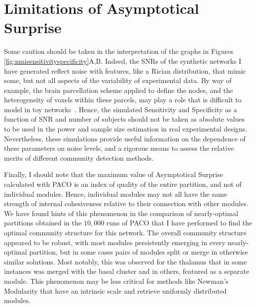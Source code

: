 \section{Limitations of Asymptotical Surprise}
Some caution should be taken in the interpretation of the graphs in Figures \ref{fig:nmisensitivityspecificity}A,B.
Indeed, the SNRs of the synthetic networks I have generated reflect noise with features, like a Rician distribution, that mimic some, but not all aspects of the variability of experimental data.
By way of example, the brain parcellation scheme applied to define the nodes, and the heterogeneity of voxels within these parcels, may play a role that is difficult to model in toy networks~\cite{fornito2010}.
Hence, the simulated Sensitivity and Specificity as a function of SNR and number of subjects should not be taken as absolute values to be used in the power and sample size estimation in real experimental designs.
Nevertheless, these simulations provide useful information on the dependence of these parameters on noise levels, and a rigorous means to assess the relative merits of different community detection methods.

Finally, I should note that the maximum value of Asymptotical Surprise calculated with PACO is an index of quality of the entire partition, and not of individual modules.
Hence, individual modules may not all have the same strength of internal cohesiveness relative to their connection with other modules.
We have found hints of this phenomenon in the comparison of nearly-optimal partitions obtained in the $10,000$ runs of PACO that I have performed to find the optimal community structure for this network.
The overall community structure appeared to be robust, with most modules persistently emerging in every nearly-optimal partition, but in some cases pairs of modules split or merge in otherwise similar solutions.
Most notably, this was observed for the thalamus that in some instances was merged with the basal cluster and in others, featured as a separate module.
This phenomenon may be less critical for methods like Newman's Modularity that have an intrinsic scale and retrieve uniformly distributed modules.

